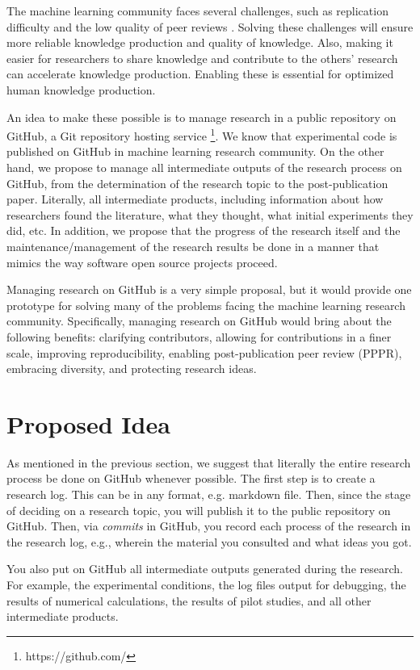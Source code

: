 \documentclass{article}
\begin{document}
The machine learning community faces several challenges, such as replication difficulty \cite{raff2019step} and the low quality of peer reviews \cite{cortes2021inconsistency}. Solving these challenges will ensure more reliable knowledge production and quality of knowledge. Also, making it easier for researchers to share knowledge and contribute to the others’ research can accelerate knowledge production. Enabling these is essential for optimized human knowledge production.

An idea to make these possible is to manage research in a public repository on GitHub, a Git repository hosting service \footnote{https://github.com/}. We know that experimental code is published on GitHub in machine learning research community. On the other hand, we propose to manage all intermediate outputs of the research process on GitHub, from the determination of the research topic to the post-publication paper. Literally, all intermediate products, including information about how researchers found the literature, what they thought, what initial experiments they did, etc. In addition, we propose that the progress of the research itself and the maintenance/management of the research results be done in a manner that mimics the way software open source projects proceed. 

Managing research on GitHub is a very simple proposal, but it would provide one prototype for solving many of the problems facing the machine learning research community. Specifically, managing research on GitHub would bring about the following benefits: clarifying contributors, allowing for contributions in a finer scale, improving reproducibility, enabling post-publication peer review (PPPR), embracing diversity, and protecting research ideas.

\section{Proposed Idea}
As mentioned in the previous section, we suggest that literally the entire research process be done on GitHub whenever possible. The first step is to create a research log. This can be in any format, e.g. markdown file. Then, since the stage of deciding on a research topic, you will publish it to the public repository on GitHub. Then, via \textit{commits} in GitHub, you record each process of the research in the research log, e.g., wherein the material you consulted and what ideas you got.

You also put on GitHub all intermediate outputs generated during the research. For example, the experimental conditions, the log files output for debugging, the results of numerical calculations, the results of pilot studies, and all other intermediate products.
\end{document}
